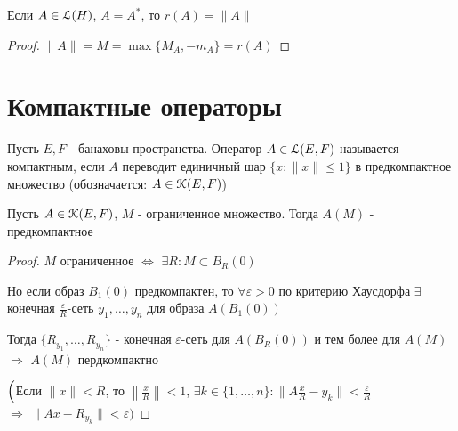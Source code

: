 \documentclass[a4paper,12pt]{report}
\begin{document}
\begin{cons}
Если $A\in\EuScript L(H)$, $A=A^*$, то $r(A)=\|A\|$
\end{cons}
\begin{proof}
$\|A\|=M=\max\{M_A,-m_A\}=r(A)$
\end{proof}









\chapter{Компактные операторы}

\begin{df}
Пусть $E,F$ - банаховы пространства. Оператор $A\in\EuScript L(E,F)$ называется компактным, если $A$ переводит единичный шар $\{x\colon\|x\|\le1\}$ в предкомпактное множество (обозначается: $A\in\EuScript K(E,F)$)
\end{df}
 


\begin{prop}
Пусть $A\in\EuScript K(E,F)$, $M$ - ограниченное множество. Тогда $A(M)$ - предкомпактное
\end{prop}
\begin{proof}
$M$ ограниченное $\Leftrightarrow$ $\exists R\colon M\subset B_R(0)$

Но если образ $B_1(0)$ предкомпактен, то $\forall\varepsilon>0$ по критерию Хаусдорфа $\exists$ конечная $\frac{\varepsilon}{R}$-сеть $y_1,\ldots,y_n$ для образа $A(B_1(0))$

Тогда $\{R_{y_1},\ldots,R_{y_n}\}$ - конечная $\varepsilon$-сеть для $A(B_R(0))$ и тем более для $A(M)$ $\Rightarrow$ $A(M)$ пердкомпактно

$\Bigl($Если $\|x\|<R$, то $\left\|\frac{x}{R}\right\|<1$, $\exists k\in\{1,\ldots,n\}\colon\|A\frac{x}{R}-y_k\|<\frac{\varepsilon}{R}$ \\$\Rightarrow$ $\|Ax-R_{y_k}\|<\varepsilon\Bigr)$
\end{proof}
 
\end{document}
